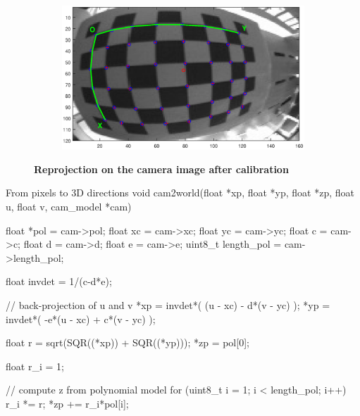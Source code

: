 \begin{figure}[h]
\begin{subfigure}[b]{0.4\textwidth}
    \end{subfigure}
	\begin{subfigure}[b]{0.4\textwidth}
        \centering
        \includegraphics[width=\textwidth]{images/camera/Reproj1.eps}
    \end{subfigure}
    \caption{\textbf{Reprojection on the camera image after calibration}}
    \label{fig:cameraReproj}
\end{figure}
\newpage

\begin{center}
\begin{code}[colback=white, label=code:cameraModel]{From pixels to 3D directions}
void cam2world(float *xp, float *yp, float *zp, float u, 
		float v, cam_model *cam)
{
	 float *pol    = cam->pol;
	 float xc      = cam->xc;
	 float yc      = cam->yc; 
	 float c       = cam->c;
	 float d       = cam->d;
	 float e       = cam->e;
	 uint8_t length_pol = cam->length_pol;

	 float invdet  = 1/(c-d*e);

	 // back-projection of u and v
	 *xp = invdet*(    (u - xc) - d*(v - yc) );
	 *yp = invdet*( -e*(u - xc) + c*(v - yc) );
	  
	 float r = sqrt(SQR((*xp)) + SQR((*yp)));
	 *zp  	 = pol[0];
	 
	 float r_i = 1;
	 
	 // compute z from polynomial model
	 for (uint8_t i = 1; i < length_pol; i++)
	 {
	   r_i *= r;
	   *zp += r_i*pol[i];
	 }
}
\end{code}
\end{center}

